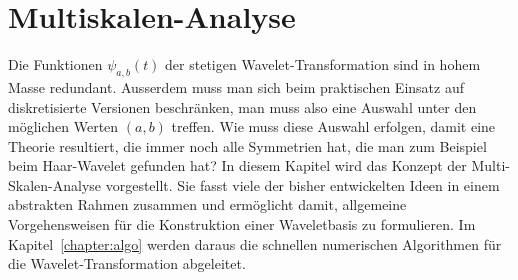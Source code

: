 %
%
%
\chapter{Multiskalen-Analyse
\label{chapter:msa}}
Die Funktionen $\psi_{a,b}(t)$ der stetigen Wavelet-Transformation
sind in hohem Masse redundant.
Ausserdem muss man sich beim praktischen Einsatz auf diskretisierte 
Versionen beschränken, man muss also eine Auswahl unter den möglichen
Werten $(a,b)$ treffen.
Wie muss diese Auswahl erfolgen, damit eine Theorie resultiert, die
immer noch alle Symmetrien hat, die man zum Beispiel beim Haar-Wavelet
gefunden hat?
In diesem Kapitel wird das Konzept der Multi-Skalen-Analyse vorgestellt.
Sie fasst viele der bisher entwickelten Ideen in einem abstrakten
Rahmen zusammen und ermöglicht damit, allgemeine Vorgehensweisen für die
Konstruktion einer Waveletbasis zu formulieren.
Im Kapitel~\ref{chapter:algo} werden daraus die schnellen numerischen
Algorithmen für die Wavelet-Transformation abgeleitet.






